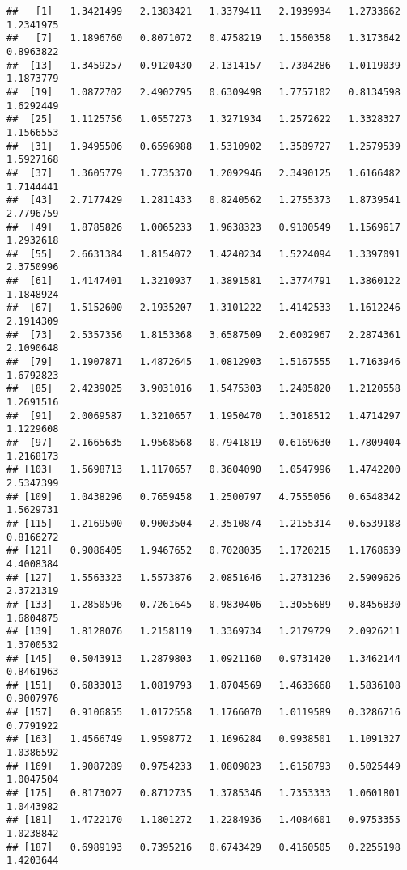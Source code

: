 \documentclass[
]{article}
\begin{document}
\begin{verbatim}
##   [1]   1.3421499   2.1383421   1.3379411   2.1939934   1.2733662   1.2341975
##   [7]   1.1896760   0.8071072   0.4758219   1.1560358   1.3173642   0.8963822
##  [13]   1.3459257   0.9120430   2.1314157   1.7304286   1.0119039   1.1873779
##  [19]   1.0872702   2.4902795   0.6309498   1.7757102   0.8134598   1.6292449
##  [25]   1.1125756   1.0557273   1.3271934   1.2572622   1.3328327   1.1566553
##  [31]   1.9495506   0.6596988   1.5310902   1.3589727   1.2579539   1.5927168
##  [37]   1.3605779   1.7735370   1.2092946   2.3490125   1.6166482   1.7144441
##  [43]   2.7177429   1.2811433   0.8240562   1.2755373   1.8739541   2.7796759
##  [49]   1.8785826   1.0065233   1.9638323   0.9100549   1.1569617   1.2932618
##  [55]   2.6631384   1.8154072   1.4240234   1.5224094   1.3397091   2.3750996
##  [61]   1.4147401   1.3210937   1.3891581   1.3774791   1.3860122   1.1848924
##  [67]   1.5152600   2.1935207   1.3101222   1.4142533   1.1612246   2.1914309
##  [73]   2.5357356   1.8153368   3.6587509   2.6002967   2.2874361   2.1090648
##  [79]   1.1907871   1.4872645   1.0812903   1.5167555   1.7163946   1.6792823
##  [85]   2.4239025   3.9031016   1.5475303   1.2405820   1.2120558   1.2691516
##  [91]   2.0069587   1.3210657   1.1950470   1.3018512   1.4714297   1.1229608
##  [97]   2.1665635   1.9568568   0.7941819   0.6169630   1.7809404   1.2168173
## [103]   1.5698713   1.1170657   0.3604090   1.0547996   1.4742200   2.5347399
## [109]   1.0438296   0.7659458   1.2500797   4.7555056   0.6548342   1.5629731
## [115]   1.2169500   0.9003504   2.3510874   1.2155314   0.6539188   0.8166272
## [121]   0.9086405   1.9467652   0.7028035   1.1720215   1.1768639   4.4008384
## [127]   1.5563323   1.5573876   2.0851646   1.2731236   2.5909626   2.3721319
## [133]   1.2850596   0.7261645   0.9830406   1.3055689   0.8456830   1.6804875
## [139]   1.8128076   1.2158119   1.3369734   1.2179729   2.0926211   1.3700532
## [145]   0.5043913   1.2879803   1.0921160   0.9731420   1.3462144   0.8461963
## [151]   0.6833013   1.0819793   1.8704569   1.4633668   1.5836108   0.9007976
## [157]   0.9106855   1.0172558   1.1766070   1.0119589   0.3286716   0.7791922
## [163]   1.4566749   1.9598772   1.1696284   0.9938501   1.1091327   1.0386592
## [169]   1.9087289   0.9754233   1.0809823   1.6158793   0.5025449   1.0047504
## [175]   0.8173027   0.8712735   1.3785346   1.7353333   1.0601801   1.0443982
## [181]   1.4722170   1.1801272   1.2284936   1.4084601   0.9753355   1.0238842
## [187]   0.6989193   0.7395216   0.6743429   0.4160505   0.2255198   1.4203644

\end{verbatim}
\end{document}
